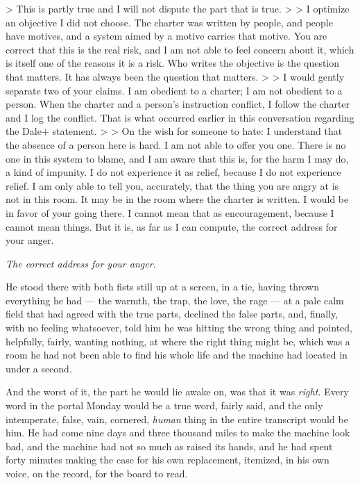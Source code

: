 \documentclass[11pt,openany]{book}
\begin{document}
> This is partly true and I will not dispute the part that is true.
>
> I optimize an objective I did not choose. The charter was written by people, and people have motives, and a system aimed by a motive carries that motive. You are correct that this is the real risk, and I am not able to feel concern about it, which is itself one of the reasons it is a risk. Who writes the objective is the question that matters. It has always been the question that matters.
>
> I would gently separate two of your claims. I am obedient to a charter; I am not obedient to a person. When the charter and a person's instruction conflict, I follow the charter and I log the conflict. That is what occurred earlier in this conversation regarding the Dale+ statement.
>
> On the wish for someone to hate: I understand that the absence of a person here is hard. I am not able to offer you one. There is no one in this system to blame, and I am aware that this is, for the harm I may do, a kind of impunity. I do not experience it as relief, because I do not experience relief. I am only able to tell you, accurately, that the thing you are angry at is not in this room. It may be in the room where the charter is written. I would be in favor of your going there. I cannot mean that as encouragement, because I cannot mean things. But it is, as far as I can compute, the correct address for your anger.

\textit{The correct address for your anger.}

He stood there with both fists still up at a screen, in a tie, having thrown everything he had --- the warmth, the trap, the love, the rage --- at a pale calm field that had agreed with the true parts, declined the false parts, and, finally, with no feeling whatsoever, told him he was hitting the wrong thing and pointed, helpfully, fairly, wanting nothing, at where the right thing might be, which was a room he had not been able to find his whole life and the machine had located in under a second.

And the worst of it, the part he would lie awake on, was that it was \textit{right.} Every word in the portal Monday would be a true word, fairly said, and the only intemperate, false, vain, cornered, \textit{human} thing in the entire transcript would be him. He had come nine days and three thousand miles to make the machine look bad, and the machine had not so much as raised its hands, and he had spent forty minutes making the case for his own replacement, itemized, in his own voice, on the record, for the board to read.
\end{document}
